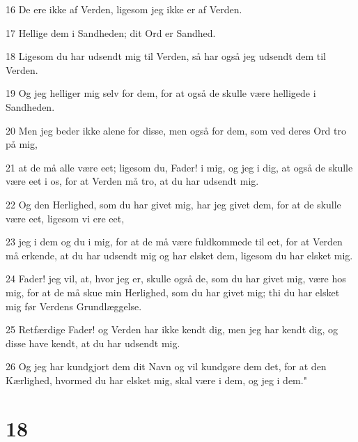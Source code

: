 \par 16 De ere ikke af Verden, ligesom jeg ikke er af Verden.
\par 17 Hellige dem i Sandheden; dit Ord er Sandhed.
\par 18 Ligesom du har udsendt mig til Verden, så har også jeg udsendt dem til Verden.
\par 19 Og jeg helliger mig selv for dem, for at også de skulle være helligede i Sandheden.
\par 20 Men jeg beder ikke alene for disse, men også for dem, som ved deres Ord tro på mig,
\par 21 at de må alle være eet; ligesom du, Fader! i mig, og jeg i dig, at også de skulle være eet i os, for at Verden må tro, at du har udsendt mig.
\par 22 Og den Herlighed, som du har givet mig, har jeg givet dem, for at de skulle være eet, ligesom vi ere eet,
\par 23 jeg i dem og du i mig, for at de må være fuldkommede til eet, for at Verden må erkende, at du har udsendt mig og har elsket dem, ligesom du har elsket mig.
\par 24 Fader! jeg vil, at, hvor jeg er, skulle også de, som du har givet mig, være hos mig, for at de må skue min Herlighed, som du har givet mig; thi du har elsket mig før Verdens Grundlæggelse.
\par 25 Retfærdige Fader! og Verden har ikke kendt dig, men jeg har kendt dig, og disse have kendt, at du har udsendt mig.
\par 26 Og jeg har kundgjort dem dit Navn og vil kundgøre dem det, for at den Kærlighed, hvormed du har elsket mig, skal være i dem, og jeg i dem."

\chapter{18}

